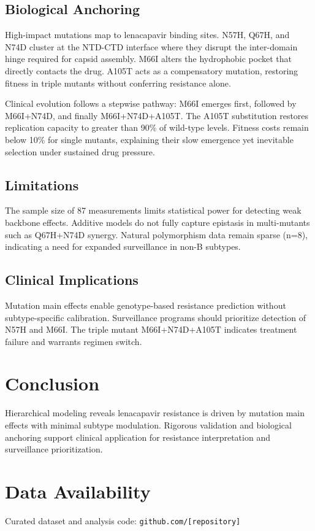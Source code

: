 \documentclass[11pt]{article}
\begin{document}
\subsection{Biological Anchoring}
High-impact mutations map to lenacapavir binding sites. N57H, Q67H, and N74D cluster at the NTD-CTD interface where they disrupt the inter-domain hinge required for capsid assembly. M66I alters the hydrophobic pocket that directly contacts the drug. A105T acts as a compensatory mutation, restoring fitness in triple mutants without conferring resistance alone.

Clinical evolution follows a stepwise pathway: M66I emerges first, followed by M66I+N74D, and finally M66I+N74D+A105T. The A105T substitution restores replication capacity to greater than 90\% of wild-type levels. Fitness costs remain below 10\% for single mutants, explaining their slow emergence yet inevitable selection under sustained drug pressure.

\subsection{Limitations}
The sample size of 87 measurements limits statistical power for detecting weak backbone effects. Additive models do not fully capture epistasis in multi-mutants such as Q67H+N74D synergy. Natural polymorphism data remain sparse (n=8), indicating a need for expanded surveillance in non-B subtypes.

\subsection{Clinical Implications}
Mutation main effects enable genotype-based resistance prediction without subtype-specific calibration. Surveillance programs should prioritize detection of N57H and M66I. The triple mutant M66I+N74D+A105T indicates treatment failure and warrants regimen switch.

\section{Conclusion}
Hierarchical modeling reveals lenacapavir resistance is driven by mutation main effects with minimal subtype modulation. Rigorous validation and biological anchoring support clinical application for resistance interpretation and surveillance prioritization.

\section*{Data Availability}
Curated dataset and analysis code: \texttt{github.com/[repository]}
\end{document}
